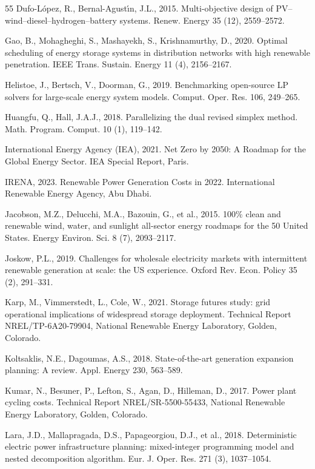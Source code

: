 \documentclass[11pt,a4paper]{article}
\begin{document}
\begin{thebibliography}{55}
Dufo-L{\'o}pez, R., Bernal-Agust{\'\i}n, J.L., 2015.
Multi-objective design of PV--wind--diesel--hydrogen--battery systems.
Renew. Energy 35 (12), 2559--2572.

Gao, B., Mohagheghi, S., Mashayekh, S., Krishnamurthy, D., 2020.
Optimal scheduling of energy storage systems in distribution networks with high renewable penetration.
IEEE Trans. Sustain. Energy 11 (4), 2156--2167.

Helistoe, J., Bertsch, V., Doorman, G., 2019.
Benchmarking open-source LP solvers for large-scale energy system models.
Comput. Oper. Res. 106, 249--265.

Huangfu, Q., Hall, J.A.J., 2018.
Parallelizing the dual revised simplex method.
Math. Program. Comput. 10 (1), 119--142.

International Energy Agency (IEA), 2021.
Net Zero by 2050: A Roadmap for the Global Energy Sector.
IEA Special Report, Paris.

IRENA, 2023.
Renewable Power Generation Costs in 2022.
International Renewable Energy Agency, Abu Dhabi.

Jacobson, M.Z., Delucchi, M.A., Bazouin, G., et al., 2015.
100\% clean and renewable wind, water, and sunlight all-sector energy roadmaps for the 50 United States.
Energy Environ. Sci. 8 (7), 2093--2117.

Joskow, P.L., 2019.
Challenges for wholesale electricity markets with intermittent renewable generation at scale: the US experience.
Oxford Rev. Econ. Policy 35 (2), 291--331.

Karp, M., Vimmerstedt, L., Cole, W., 2021.
Storage futures study: grid operational implications of widespread storage deployment.
Technical Report NREL/TP-6A20-79904, National Renewable Energy Laboratory, Golden, Colorado.

Koltsaklis, N.E., Dagoumas, A.S., 2018.
State-of-the-art generation expansion planning: A review.
Appl. Energy 230, 563--589.

Kumar, N., Besuner, P., Lefton, S., Agan, D., Hilleman, D., 2017.
Power plant cycling costs.
Technical Report NREL/SR-5500-55433, National Renewable Energy Laboratory, Golden, Colorado.

Lara, J.D., Mallapragada, D.S., Papageorgiou, D.J., et al., 2018.
Deterministic electric power infrastructure planning: mixed-integer programming model and nested decomposition algorithm.
Eur. J. Oper. Res. 271 (3), 1037--1054.


\end{thebibliography}
\end{document}
